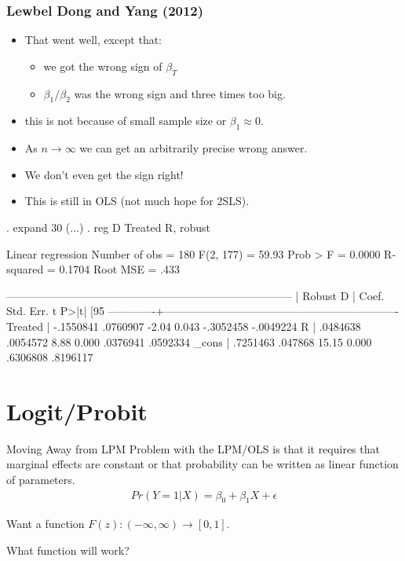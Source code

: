 \begin{frame}[fragile]
\frametitle{Lewbel Dong and Yang (2012)}
\begin{itemize}
\item That went well, except that:
\begin{itemize}
\item we got the wrong sign of $\beta_T$
\item $\beta_1/\beta_2$ was the wrong sign and three times too big.
\end{itemize}
\item this is not because of small sample size or $\beta_1 \approx 0$.
\item As $n \rightarrow \infty$ we can get an arbitrarily precise wrong answer.
\item We don't even get the sign right!
\item This is still in OLS (not much hope for 2SLS).
\end{itemize}
\tiny
\begin{semiverbatim}
. expand 30
(...)
. reg D Treated R, robust

Linear regression                               Number of obs     =        180
                                          F(2, 177)         =      59.93
                                          Prob > F          =     0.0000
                                          R-squared         =     0.1704
                                          Root MSE          =       .433

------------------------------------------------------------------------------
       |               Robust
       D |      Coef.   Std. Err.      t    P>|t|     [95%
-------------+----------------------------------------------------------------
Treated |  -.1550841   .0760907    -2.04   0.043    -.3052458   -.0049224
       R |   .0484638   .0054572     8.88   0.000     .0376941    .0592334
_cons |   .7251463    .047868    15.15   0.000     .6306808    .8196117
\end{semiverbatim}
\end{frame}

\section{Logit/Probit}


\begin{frame}{Moving Away from LPM}
Problem with the LPM/OLS is that it requires that \alert{marginal effects are constant} or that probability can be written as linear function of parameters.
\begin{eqnarray*}
Pr(Y=1 | X) = \beta_0 + \beta_1 X+ \epsilon
\end{eqnarray*}

Want a function $F(z): (-\infty,\infty) \rightarrow [0,1]$.

What function will work?

\end{frame}

